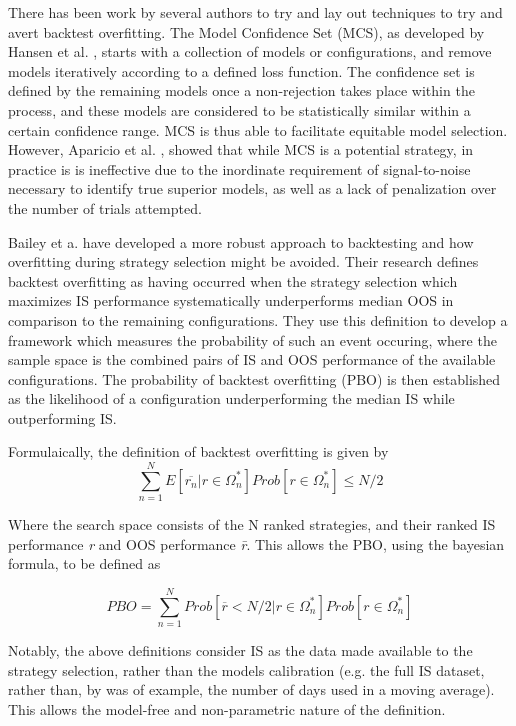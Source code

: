 \documentclass[a4paper,latin]{paper}
\begin{document}
There has been work by several authors to try and lay out techniques to try and avert backtest overfitting. 
The Model Confidence Set (MCS), as developed by Hansen et al. \cite{Hansen}, starts with a 
collection of models or configurations, and remove models iteratively according to a defined loss function. 
The confidence set is defined by the remaining models once a non-rejection takes place within the process, and 
these models are considered to be statistically similar within a certain confidence range. MCS is thus able to facilitate 
equitable model selection. However, Aparicio et al. \cite{Aparicio}, showed  that while MCS is a potential strategy, in 
practice is is ineffective due to the inordinate requirement of signal-to-noise necessary to identify true superior 
models, as well as a lack of penalization over the number of trials attempted.
\hfill \break

Bailey et a. \cite{BailyPBO} have developed a more robust approach to backtesting and how overfitting during strategy 
selection might be avoided. Their research defines backtest overfitting as having occurred when the strategy 
selection which maximizes IS performance systematically underperforms median OOS in comparison to the 
remaining configurations. They use this definition to develop a framework which measures the probability of such 
an event occuring, where the sample space is the combined pairs of IS and OOS performance of the available 
configurations. The probability of backtest overfitting (PBO) is then established as the likelihood of a configuration 
underperforming the median IS while outperforming IS. 
\hfill \break 

Formulaically, the definition of backtest overfitting is given by
\begin{equation}\label{eq:PBO1}
\sum_{n=1}^{N}E[\overline{r_n}|r\in 
\Omega_{n}^{*}]Prob[r\in\Omega_{n}^{*}]\leq{N/2}
\end{equation}

Where the search space {\textOmega} consists of the N ranked strategies, and their ranked IS performance \textit{r} and OOS performance
\textit{\={r}}. This allows the PBO, using the bayesian formula, to be defined as 

\begin{equation}\label{eq:PBO2}
  PBO = \sum_{n=1}^{N}Prob[\overline{r} < {N/2}|r\in\Omega_{n}^{*}]Prob[r\in\Omega_{n}^{*}]
  \end{equation}

Notably, the above definitions consider IS as the data made available to the strategy selection, rather than the 
models calibration (e.g. the full IS dataset, rather than, by was of example, the number of days used in a moving average). 
This allows the model-free and non-parametric nature of the definition. 
\hfill \break 
\end{document}
